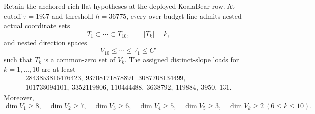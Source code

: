 \begin{theorem}
\label{thm:mca-rank11-nested-pinned-span}
Retain the anchored rich-flat hypotheses at the deployed KoalaBear row.
At cutoff $\tau=1937$ and threshold $h=36775$, every over-budget line
admits nested actual coordinate sets
\[
 T_1\subset\cdots\subset T_{10},\qquad |T_k|=k,
\]
and nested direction spaces
\[
 V_{10}\le\cdots\le V_1\le C'
\]
such that $T_k$ is a common-zero set of $V_k$.  The assigned distinct-slope
loads for $k=1,\ldots,10$ are at least
\[
\begin{gathered}
2843853816476423,\ 93708171878891,\ 3087708134499,\\
101738094101,\ 3352119806,\ 110444488,\ 3638792,\ 119884,\ 3950,\ 131.
\end{gathered}
\]
Moreover,
\[
 \dim V_1\ge8,\quad \dim V_2\ge7,\quad \dim V_3\ge6,\quad
 \dim V_4\ge5,\quad \dim V_5\ge3,\quad \dim V_k\ge2\ (6\le k\le10).
\]
\end{theorem}
